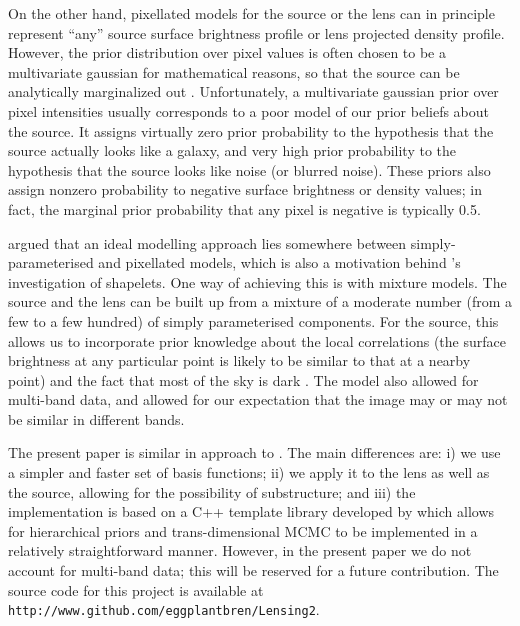 \documentclass[useAMS,usenatbib]{mn2e}
\begin{document}
On the
other hand, pixellated models for the source \citep[e.g.][]{suyu} or the lens
\citep[e.g.][]{2014MNRAS.445.2181C} can in principle represent ``any''
source surface brightness profile or lens projected density profile. However, the prior
distribution over pixel values is often chosen to be a multivariate gaussian
for mathematical reasons, so
that the source can be analytically marginalized out
\citep{2003ApJ...590..673W}. Unfortunately, a multivariate gaussian prior
over pixel intensities usually corresponds to a poor model of our prior
beliefs about the source. It assigns virtually zero prior probability
to the hypothesis that the source actually looks like a galaxy, and very high
prior probability to the hypothesis that the source looks like noise (or
blurred noise). These priors also assign nonzero probability to negative
surface brightness or density values; in fact, the marginal prior probability
that any pixel is negative is typically 0.5.

\citet{2011MNRAS.412.2521B} argued that an ideal
modelling approach lies somewhere between simply-parameterised and
pixellated models, which is also a motivation behind
\citet{2015arXiv150500198T}'s investigation of shapelets.
One way of achieving this is with mixture models.
The source and the lens can be built up from a mixture of a moderate
number (from a few to a few hundred) of
simply parameterised components. For the source, this allows
us to incorporate prior knowledge about the local correlations (the surface
brightness at any particular point is likely to be similar to that at a
nearby point) and the fact that most of the sky is
dark \citep{2006ApJ...637..608B}. The \citet{2011MNRAS.412.2521B} model also
allowed for multi-band data, and allowed for our expectation that the image
may or may not be similar in different bands.

The present paper is similar in approach to \citet{2011MNRAS.412.2521B}.
The main differences are:
i) we use a simpler and faster set of basis functions;
ii) we apply it to the lens as well as the source, allowing for the
possibility of substructure; and
iii) the implementation is based on a C++ template library developed by
\citet{rjobject} which allows for hierarchical priors and trans-dimensional
MCMC to be implemented in a relatively straightforward manner.
However, in the present paper we do not account for
multi-band data; this will be reserved for a future contribution.
The source code for this project is available at
{\tt http://www.github.com/eggplantbren/Lensing2}.
\end{document}
